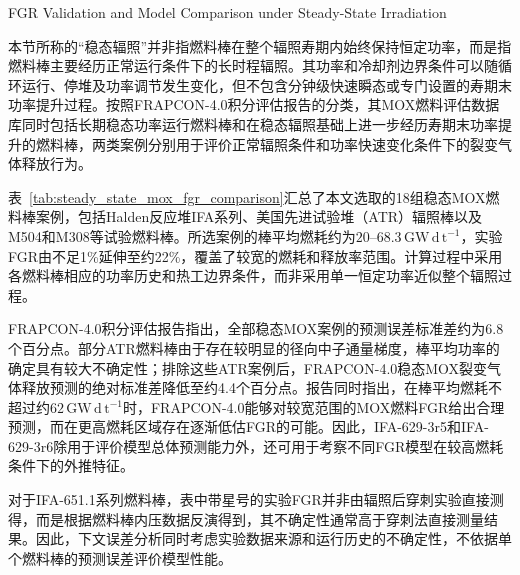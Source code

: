 {FGR Validation and Model Comparison under Steady-State Irradiation}

本节所称的“稳态辐照”并非指燃料棒在整个辐照寿期内始终保持恒定功率，而是指燃料棒主要经历正常运行条件下的长时程辐照。其功率和冷却剂边界条件可以随循环运行、停堆及功率调节发生变化，但不包含分钟级快速瞬态或专门设置的寿期末功率提升过程。按照FRAPCON-4.0积分评估报告的分类，其MOX燃料评估数据库同时包括长期稳态功率运行燃料棒和在稳态辐照基础上进一步经历寿期末功率提升的燃料棒，两类案例分别用于评价正常辐照条件和功率快速变化条件下的裂变气体释放行为。

表~\ref{tab:steady_state_mox_fgr_comparison}汇总了本文选取的18组稳态MOX燃料棒案例，包括Halden反应堆IFA系列、美国先进试验堆（ATR）辐照棒以及M504和M308等试验燃料棒。所选案例的棒平均燃耗约为$20$--$68.3\,\mathrm{GW\,d\,t^{-1}}$，实验FGR由不足1\%延伸至约22\%，覆盖了较宽的燃耗和释放率范围。计算过程中采用各燃料棒相应的功率历史和热工边界条件，而非采用单一恒定功率近似整个辐照过程。

FRAPCON-4.0积分评估报告指出，全部稳态MOX案例的预测误差标准差约为6.8个百分点。部分ATR燃料棒由于存在较明显的径向中子通量梯度，棒平均功率的确定具有较大不确定性；排除这些ATR案例后，FRAPCON-4.0稳态MOX裂变气体释放预测的绝对标准差降低至约4.4个百分点。报告同时指出，在棒平均燃耗不超过约$62\,\mathrm{GW\,d\,t^{-1}}$时，FRAPCON-4.0能够对较宽范围的MOX燃料FGR给出合理预测，而在更高燃耗区域存在逐渐低估FGR的可能。因此，IFA-629-3r5和IFA-629-3r6除用于评价模型总体预测能力外，还可用于考察不同FGR模型在较高燃耗条件下的外推特征。

对于IFA-651.1系列燃料棒，表中带星号的实验FGR并非由辐照后穿刺实验直接测得，而是根据燃料棒内压数据反演得到，其不确定性通常高于穿刺法直接测量结果。因此，下文误差分析同时考虑实验数据来源和运行历史的不确定性，不依据单个燃料棒的预测误差评价模型性能。

